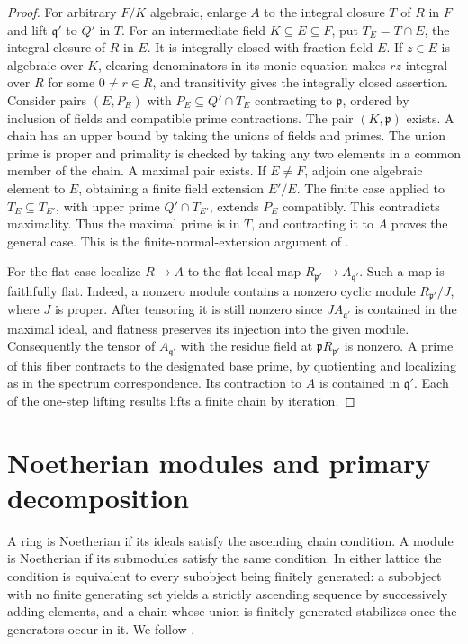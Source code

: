 \documentclass[11pt,oneside,openany]{book}
\theoremstyle{definition}
\theoremstyle{remark}
\begin{document}
\begin{proof}
For arbitrary \(F/K\) algebraic, enlarge \(A\) to the integral closure \(T\) of \(R\) in \(F\) and lift \(\mathfrak q'\) to \(Q'\) in \(T\). For an intermediate field \(K\subseteq E\subseteq F\), put \(T_E=T\cap E\), the integral closure of \(R\) in \(E\). It is integrally closed with fraction field \(E\). If \(z\in E\) is algebraic over \(K\), clearing denominators in its monic equation makes \(rz\) integral over \(R\) for some \(0\ne r\in R\), and transitivity gives the integrally closed assertion. Consider pairs \((E,P_E)\) with \(P_E\subseteq Q'\cap T_E\) contracting to \(\mathfrak p\), ordered by inclusion of fields and compatible prime contractions. The pair \((K,\mathfrak p)\) exists. A chain has an upper bound by taking the unions of fields and primes. The union prime is proper and primality is checked by taking any two elements in a common member of the chain. A maximal pair exists. If \(E\ne F\), adjoin one algebraic element to \(E\), obtaining a finite field extension \(E'/E\). The finite case applied to \(T_E\subseteq T_{E'}\), with upper prime \(Q'\cap T_{E'}\), extends \(P_E\) compatibly. This contradicts maximality. Thus the maximal prime is in \(T\), and contracting it to \(A\) proves the general case. This is the finite-normal-extension argument of \cite[Theorem 13.9 and Proposition 13.10]{eisenbud}.

For the flat case localize \(R\to A\) to the flat local map \(R_{\mathfrak p'}\to A_{\mathfrak q'}\). Such a map is faithfully flat. Indeed, a nonzero module contains a nonzero cyclic module \(R_{\mathfrak p'}/J\), where \(J\) is proper. After tensoring it is still nonzero since \(JA_{\mathfrak q'}\) is contained in the maximal ideal, and flatness preserves its injection into the given module. Consequently the tensor of \(A_{\mathfrak q'}\) with the residue field at \(\mathfrak pR_{\mathfrak p'}\) is nonzero. A prime of this fiber contracts to the designated base prime, by quotienting and localizing as in the spectrum correspondence. Its contraction to \(A\) is contained in \(\mathfrak q'\). Each of the one-step lifting results lifts a finite chain by iteration.
\end{proof}
\chapter{Noetherian modules and primary decomposition}
\label{p103:ch05}

A ring is Noetherian if its ideals satisfy the ascending chain condition. A module is Noetherian if its submodules satisfy the same condition. In either lattice the condition is equivalent to every subobject being finitely generated: a subobject with no finite generating set yields a strictly ascending sequence by successively adding elements, and a chain whose union is finitely generated stabilizes once the generators occur in it. We follow \cite[Sections 1.4 and 2.2 and Chapter 3]{eisenbud}.
\end{document}
